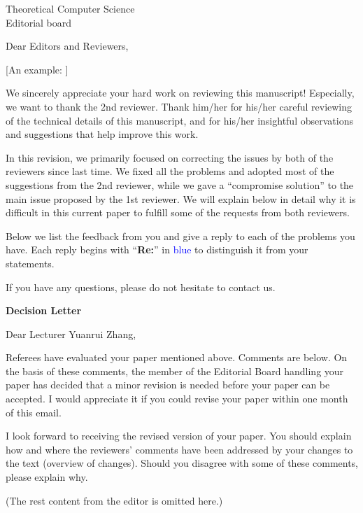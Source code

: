 \documentclass[a4paper,10pt]{letter}
\newcommand{\editor}[1]{\hrulefill\par{\Large\textbf{#1}}}
\newcommand{\ins}[1]{\textcolor{blue}{#1}} %
\begin{document}
\begin{letter}{Theoretical Computer Science\\
    Editorial board}

\opening{Dear Editors and Reviewers,}

[An example: ]

We sincerely appreciate your hard work on reviewing this manuscript! Especially, we want to thank the 2nd reviewer. Thank him/her for his/her careful reviewing of the technical details of this manuscript, and for his/her insightful observations and suggestions that help improve this work. 

In this revision, we primarily focused on correcting the issues by both of the reviewers since last time. 
We fixed all the problems and adopted most of the suggestions from the 2nd reviewer, while we gave a ``compromise solution'' to the main issue proposed by the 1st reviewer. 
We will explain below in detail why it is difficult in this current paper to fulfill some of the requests from both reviewers. 


Below we list the feedback from you and give a reply to each of the problems you have.
Each reply begins with ``\textbf{Re:}'' in {\ins{blue}} to distinguish it from your statements. 


If you have any questions, please do not hesitate to contact us. 

\editor{Decision Letter}

Dear Lecturer Yuanrui Zhang,

Referees have evaluated your paper mentioned above. Comments are below. On the basis of these comments, the member of the Editorial Board handling your paper has decided that a minor revision is needed before your paper can be accepted. I would appreciate it if you could revise your paper within one month of this email.

I look forward to receiving the revised version of your paper. You should explain how and where the reviewers' comments have been addressed by your changes to the text (overview of changes). Should you disagree with some of these comments, please explain why.


(The rest content from the editor is omitted here.)


\end{letter}
\end{document}
